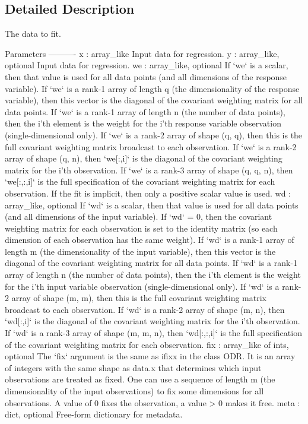 \subsection{Detailed Description}
\begin{DoxyVerb}The data to fit.

Parameters
----------
x : array_like
    Input data for regression.
y : array_like, optional
    Input data for regression.
we : array_like, optional
    If `we` is a scalar, then that value is used for all data points (and
    all dimensions of the response variable).
    If `we` is a rank-1 array of length q (the dimensionality of the
    response variable), then this vector is the diagonal of the covariant
    weighting matrix for all data points.
    If `we` is a rank-1 array of length n (the number of data points), then
    the i'th element is the weight for the i'th response variable
    observation (single-dimensional only).
    If `we` is a rank-2 array of shape (q, q), then this is the full
    covariant weighting matrix broadcast to each observation.
    If `we` is a rank-2 array of shape (q, n), then `we[:,i]` is the
    diagonal of the covariant weighting matrix for the i'th observation.
    If `we` is a rank-3 array of shape (q, q, n), then `we[:,:,i]` is the
    full specification of the covariant weighting matrix for each
    observation.
    If the fit is implicit, then only a positive scalar value is used.
wd : array_like, optional
    If `wd` is a scalar, then that value is used for all data points
    (and all dimensions of the input variable). If `wd` = 0, then the
    covariant weighting matrix for each observation is set to the identity
    matrix (so each dimension of each observation has the same weight).
    If `wd` is a rank-1 array of length m (the dimensionality of the input
    variable), then this vector is the diagonal of the covariant weighting
    matrix for all data points.
    If `wd` is a rank-1 array of length n (the number of data points), then
    the i'th element is the weight for the i'th input variable observation
    (single-dimensional only).
    If `wd` is a rank-2 array of shape (m, m), then this is the full
    covariant weighting matrix broadcast to each observation.
    If `wd` is a rank-2 array of shape (m, n), then `wd[:,i]` is the
    diagonal of the covariant weighting matrix for the i'th observation.
    If `wd` is a rank-3 array of shape (m, m, n), then `wd[:,:,i]` is the
    full specification of the covariant weighting matrix for each
    observation.
fix : array_like of ints, optional
    The `fix` argument is the same as ifixx in the class ODR. It is an
    array of integers with the same shape as data.x that determines which
    input observations are treated as fixed. One can use a sequence of
    length m (the dimensionality of the input observations) to fix some
    dimensions for all observations. A value of 0 fixes the observation,
    a value > 0 makes it free.
meta : dict, optional
    Free-form dictionary for metadata.


\end{DoxyVerb}
